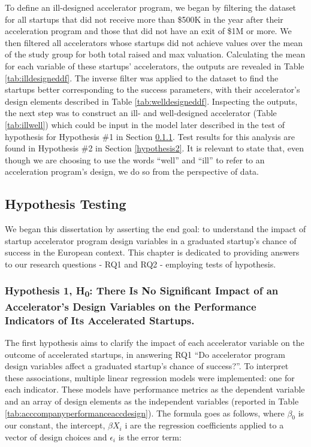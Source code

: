 \documentclass[
  12pt,
]{article}
\begin{document}
To define an ill-designed accelerator program, we began by filtering the dataset for all startups that did not receive more than \$500K in the year after their acceleration program and those that did not have an exit of \$1M or more. We then filtered all accelerators whose startups did not achieve values over the mean of the study group for both total raised and max valuation. Calculating the mean for each variable of these startups' accelerators, the outputs are revealed in Table \ref{tab:illdesigneddf}. The inverse filter was applied to the dataset to find the startups better corresponding to the success parameters, with their accelerator's design elements described in Table \ref{tab:welldesigneddf}. Inspecting the outputs, the next step was to construct an ill- and well-designed accelerator (Table \ref{tab:illwell}) which could be input in the model later described in the test of hypothesis for Hypothesis \#1 in Section \ref{hypothesis1}. Test results for this analysis are found in Hypothesis \#2 in Section \ref{hypothesis2}. It is relevant to state that, even though we are choosing to use the words ``well'' and ``ill'' to refer to an acceleration program's design, we do so from the perspective of data.

\hypertarget{hypothesis-testing}{%
\subsection{Hypothesis Testing}\label{hypothesis-testing}}

We began this dissertation by asserting the end goal: to understand the impact of startup accelerator program design variables in a graduated startup's chance of success in the European context. This chapter is dedicated to providing answers to our research questions - RQ1 and RQ2 - employing tests of hypothesis.

\hypertarget{hypothesis1}{%
\subsubsection{\texorpdfstring{Hypothesis 1, H\textsubscript{0}: There Is No Significant Impact of an Accelerator's Design Variables on the Performance Indicators of Its Accelerated Startups.}{Hypothesis 1, H0: There Is No Significant Impact of an Accelerator's Design Variables on the Performance Indicators of Its Accelerated Startups.}}\label{hypothesis1}}

The first hypothesis aims to clarify the impact of each accelerator variable on the outcome of accelerated startups, in answering RQ1 ``Do accelerator program design variables affect a graduated startup's chance of success?''. To interpret these associations, multiple linear regression models were implemented: one for each indicator. These models have performance metrics as the dependent variable and an array of design elements as the independent variables (reported in Table \ref{tab:acccompanyperformanceaccdesign}). The formula goes as follows, where \(\beta_0\) is our constant, the intercept, \(\beta X_i\) i are the regression coefficients applied to a vector of design choices and \(\epsilon_i\) is the error term:
\end{document}
